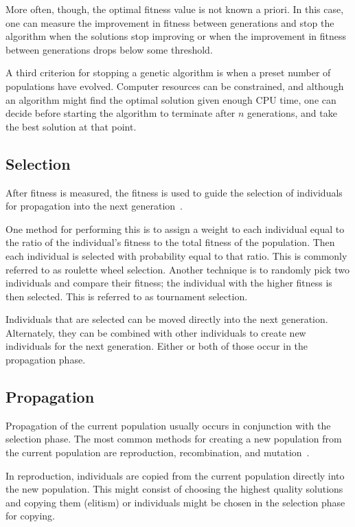 More often, though, the optimal fitness value is not known a priori. In this
case, one can measure the improvement in fitness between generations and stop
the algorithm when the solutions stop improving or when the improvement in
fitness between generations drops below some threshold.

A third criterion for stopping a genetic algorithm is when a preset number of
populations have evolved. Computer resources can be constrained, and although
an algorithm might find the optimal solution given enough CPU time, one can 
decide before starting the algorithm to terminate after \(n\) generations, and
take the best solution at that point.

\subsection{Selection}

After fitness is measured, the fitness is used to guide the selection of
individuals for propagation into the next
generation~\cite{haupt2004practical,dejong2006evolutionary}.

One method for performing this is to assign a weight to each individual
equal to the ratio of the individual's fitness to the total fitness of the
population. Then each individual is selected with probability equal to that
ratio. This is commonly referred to as roulette wheel selection. Another
technique is to randomly pick two individuals and compare their fitness; the
individual with the higher fitness is then selected. This is referred to as
tournament selection. 

Individuals that are selected can be moved directly into the next generation.
Alternately, they can be combined with other individuals to create new
individuals for the next generation. Either or both of those occur in the
propagation phase.

\subsection{Propagation}

Propagation of the current population usually occurs in conjunction with the
selection phase. The most common methods for creating a new population from the
current population are reproduction, recombination, and
mutation~\cite{goldberg1989genetic,haupt2004practical,DeJong:1989:UGA:93126.93172}.

In reproduction, individuals are copied from the current population directly
into the new population. This might consist of choosing the highest quality
solutions and copying them (elitism) or individuals might be chosen in the
selection phase for copying.

